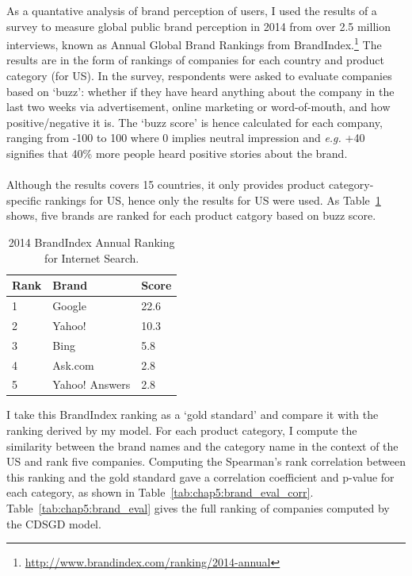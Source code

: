\documentclass[a4paper,12pt,twoside,openright]{report}
\newcommand{\ti}{\textit}
\newcommand{\nl}{\\ \\}
\begin{document}
As a quantative analysis of brand perception of users, I used the results of a survey to measure global public brand perception in 2014 from over 2.5 million interviews, known as Annual Global Brand Rankings from BrandIndex.\footnote{\url{http://www.brandindex.com/ranking/2014-annual}} The results are in the form of rankings of companies for each country and product category (for US). In the survey, respondents were asked to evaluate companies based on `buzz': whether if they have heard anything about the company in the last two weeks via advertisement, online marketing or word-of-mouth, and how positive/negative it is. The `buzz score' is hence calculated for each company, ranging from -100 to 100 where 0 implies neutral impression and \ti{e.g.} +40 signifies that 40\% more people heard positive stories about the brand.
\nl
Although the results covers 15 countries, it only provides product category-specific rankings for US, hence only the results for US were used. As Table~\ref{tab:chap5:search} shows, five brands are ranked for each product catgory based on buzz score.

\begin{table}[h]
\centering
\begin{tabular}{lll}
Rank & Brand          & Score \\ \hline
1    & Google         & 22.6  \\
2    & Yahoo!         & 10.3  \\
3    & Bing           & 5.8   \\
4    & Ask.com        & 2.8   \\
5    & Yahoo! Answers &    2.8 \\  \hline
\end{tabular}
\caption[2014 BrandIndex Annual Ranking for Internet Search]{2014 BrandIndex Annual Ranking for Internet Search.\footnotemark{}}
\label{tab:chap5:search}
\end{table}

I take this BrandIndex ranking as a `gold standard' and compare it with the ranking derived by my model. For each product category, I compute the similarity between the brand names and the category name in the context of the US and rank five companies. Computing the Spearman's rank correlation between this ranking and the gold standard gave a correlation coefficient and p-value for each category, as shown in Table~\ref{tab:chap5:brand_eval_corr}. Table~\ref{tab:chap5:brand_eval} gives the full ranking of companies computed by the CDSGD model.
\end{document}

